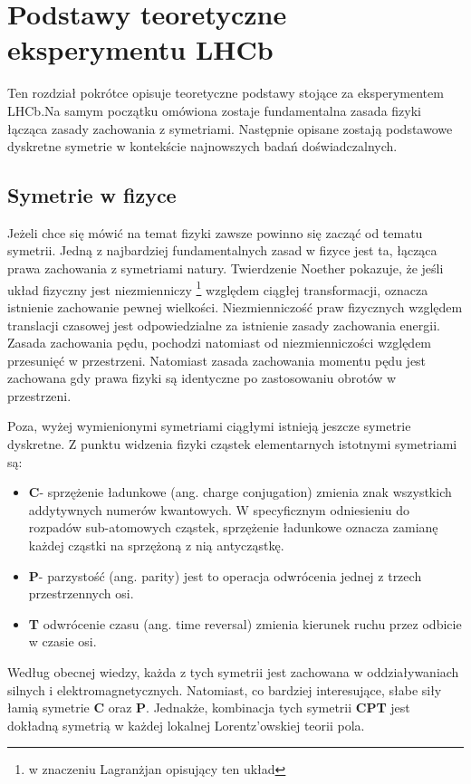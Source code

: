 \chapter{Podstawy teoretyczne eksperymentu LHCb}

Ten rozdział pokrótce opisuje teoretyczne podstawy stojące za eksperymentem LHCb.Na samym początku omówiona zostaje fundamentalna zasada fizyki łącząca zasady zachowania z symetriami. Następnie opisane zostają podstawowe dyskretne symetrie w kontekście najnowszych badań doświadczalnych.   

\section{Symetrie w fizyce}
Jeżeli chce się mówić na temat fizyki zawsze powinno się zacząć od tematu symetrii. Jedną z najbardziej fundamentalnych zasad w fizyce jest ta, łącząca prawa zachowania z symetriami natury. Twierdzenie Noether pokazuje, że jeśli układ fizyczny jest niezmienniczy \footnote{w znaczeniu Lagranżjan opisujący ten układ} względem ciągłej transformacji, oznacza istnienie zachowanie pewnej wielkości. Niezmienniczość praw fizycznych względem translacji czasowej jest odpowiedzialne za istnienie zasady zachowania energii. Zasada zachowania pędu, pochodzi natomiast od niezmienniczości względem przesunięć w przestrzeni. Natomiast zasada zachowania momentu pędu jest zachowana gdy prawa fizyki są identyczne po zastosowaniu obrotów w przestrzeni. 

Poza, wyżej wymienionymi symetriami ciągłymi istnieją jeszcze symetrie dyskretne. Z punktu widzenia fizyki cząstek elementarnych istotnymi symetriami są:

\begin{itemize}
\item \textbf{C}- sprzężenie ładunkowe (ang. charge conjugation) zmienia znak wszystkich addytywnych numerów kwantowych. W specyficznym odniesieniu do rozpadów sub-atomowych cząstek, sprzężenie ładunkowe oznacza zamianę każdej cząstki na sprzężoną z nią antycząstkę.
\item \textbf{P}- parzystość (ang. parity) jest to operacja odwrócenia jednej z trzech przestrzennych osi.
\item \textbf{T} odwrócenie czasu (ang. time reversal) zmienia kierunek ruchu przez odbicie w czasie osi. 
\end{itemize}

Według obecnej wiedzy, każda z tych symetrii jest zachowana w oddziaływaniach silnych i elektromagnetycznych. Natomiast, co bardziej interesujące, słabe siły łamią symetrie \textbf{C} oraz \textbf{P}. Jednakże, kombinacja tych symetrii \textbf{CPT} jest dokładną symetrią w każdej lokalnej Lorentz'owskiej teorii pola.

